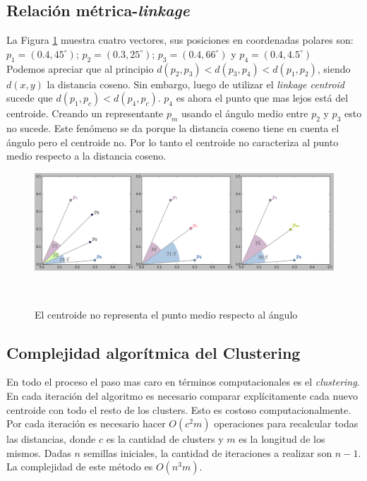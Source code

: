 \subsection{Relaci\'on m\'etrica-\textit{linkage}}

La Figura \ref{fig:cos_cen} muestra cuatro vectores, sus posiciones en coordenadas
polares son: $ p_1 = (0.4, 45^\circ)$;  $p_2 = (0.3, 25^\circ)$;  $p_3 = (0.4, 66^\circ)$
y $p_4 = (0.4, 4.5^\circ) $ \\

Podemos apreciar que al principio $d(p_2,p_3) < d(p_3,p_4) < d(p_1,p_2)$, siendo
$d(x,y)$ la distancia coseno. Sin embargo, luego de utilizar el 
\textit{linkage centroid} sucede que $d(p_1,p_c) < d(p_4,p_c)$. $p_4$
es ahora el punto que mas lejos est\'a del centroide. Creando un representante
$p_m$ usando el \'angulo medio entre $p_2$ y $p_3$ esto no sucede. Este fen\'omeno
se da porque la distancia coseno tiene en cuenta el \'angulo pero el centroide
no. Por lo tanto el centroide no caracteriza al punto medio respecto a la
distancia coseno.\\

\begin{figure}[h!]
                                                                                                                        
\begin{minipage}[b]{\textwidth}
    \includegraphics[width=\textwidth]{img/cosine_centroid.png}
    \caption{El centroide no representa el punto medio respecto al \'angulo}
    \label{fig:cos_cen}
\end{minipage} ~

\end{figure}  

\subsection{Complejidad algor\'itmica del Clustering}

En todo el proceso el paso mas caro en t\'erminos computacionales es el
\textit{clustering}. En cada iteraci\'on del algoritmo es necesario comparar 
expl\'icitamente cada nuevo centroide con todo el resto de los clusters. Esto 
es costoso computacionalmente. Por cada iteraci\'on es necesario hacer $O(c^2 m)$
operaciones para recalcular todas las distancias, donde $c$ es la cantidad de
clusters y $m$ es la longitud de los mismos. Dadas $n$ semillas iniciales, la 
cantidad de iteraciones a realizar son $n-1$. La complejidad de este m\'etodo es
$O(n^3 m)$.

